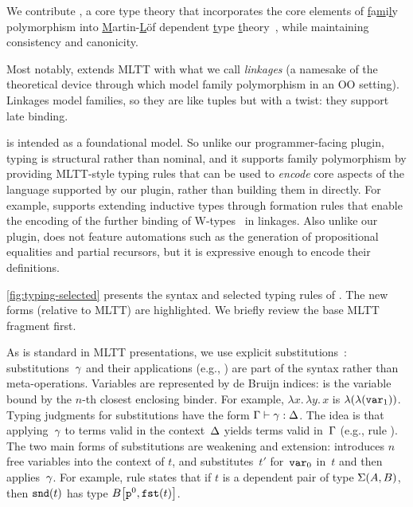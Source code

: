 We contribute \TT, a core type theory that incorporates the core elements
of \underline{f}a\underline{m}i\underline{l}y polymorphism into
\underline{M}artin-\underline{L}öf dependent \underline{t}ype \underline{t}heory~\cite{martin1982constructive},
while maintaining consistency and canonicity.

Most notably, \TT extends MLTT with what we call \emph{linkages}
(a namesake of the theoretical device through which \citet{zm2017} model
family polymorphism in an OO setting).
Linkages model families, so they are like tuples but with a twist: they
support late binding.

\TT is intended as a foundational model. So unlike our programmer-facing plugin,
typing is structural rather than nominal, and
it supports family polymorphism by providing MLTT-style typing rules that
can be used to \emph{encode} core aspects of the language supported by our
plugin, rather than building them in directly.
%
For example, \TT supports extending inductive types through
formation rules that enable the encoding of the further binding of W-types~\cite{martin1984intuitionistic} in linkages.
Also unlike our plugin, \TT does not feature automations such as
the generation of propositional equalities and partial recursors,
but it is expressive enough to encode their definitions.




\cref{fig:typing-selected} presents the syntax and selected typing rules of \TT.
The new forms (relative to MLTT) are highlighted.
We briefly review the base MLTT fragment first.

As is standard in MLTT presentations, we use explicit substitutions~\cite{substcalculus,abadi1989subst}:
substitutions~$\gamma$ and their applications (e.g., ) are part
of the syntax rather than meta-operations.
%
Variables are represented by de Bruijn indices:
 is the variable bound by the $n$-th closest enclosing binder.
For example, $\lambda x.\,\lambda y.\,x$ is $\lambda({\lambda({\texttt{var}_{1}})})$.
%
Typing judgments for substitutions have the form 
$ {\Gamma} \vdash {\ensuremath{\gamma}} : {\Delta} $.
The idea is that applying~$\gamma$ to terms valid in the context~$\Delta$
yields terms valid in~$\Gamma$ (e.g., rule ).
%
The two main forms of substitutions are weakening and extension:
 introduces $n$ free variables into the context of $t$, and
 substitutes~$t'$ for~$\texttt{var}_{0}$ in~$t$ and
then applies~$\gamma$.
For example, rule  states that if $t$ is a dependent pair
of type $\Sigma({A},{B})$, then $\texttt{snd}({t})$ has type ${B}\!\left[{{\texttt{p}^{0}},{\texttt{fst}({t})}}\right]$.

